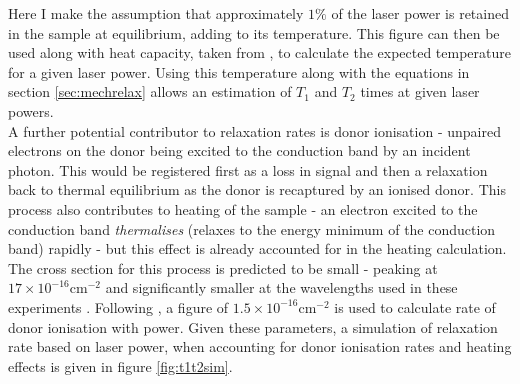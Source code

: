 Here I make the assumption that approximately $1\%$ of the laser power is retained in the sample at equilibrium, adding to its temperature.
This figure can then be used along with heat capacity, taken from \cite{Desai1986,Glazov2001}, to calculate the expected temperature for a given laser power.
Using this temperature along with the equations in section \ref{sec:mechrelax} allows an estimation of $T_1$ and $T_2$ times at given laser powers.
\\
A further potential contributor to relaxation rates is donor ionisation - unpaired electrons on the donor being excited to the conduction band by an incident photon.
This would be registered first as a loss in signal and then a relaxation back to thermal equilibrium as the donor is recaptured by an ionised donor.
This process also contributes to heating of the sample - an electron excited to the conduction band \emph{thermalises} (relaxes to the energy minimum of the conduction band) rapidly - but this effect is already accounted for in the heating calculation.
The cross section for this process is predicted to be small - peaking at $17\times10^{-16}\text{cm}^{-2}$ and significantly smaller at the wavelengths used in these experiments \cite{Sclar1984,Ross2017a}.
Following \cite{Ross2017a}, a figure of $1.5\times10^{-16}\text{cm}^{-2}$ is used to calculate rate of donor ionisation with power.
Given these parameters, a simulation of relaxation rate based on laser power, when accounting for donor ionisation rates and heating effects is given in figure \ref{fig:t1t2sim}.

